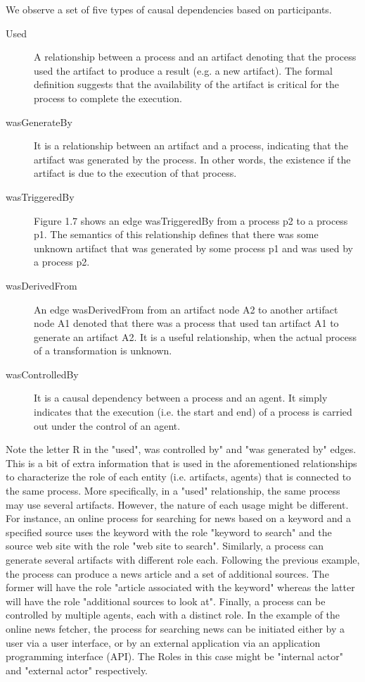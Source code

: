 We observe a set of five types of causal dependencies based on participants.

\begin{description}
  \item[Used]
        A relationship between a process and an artifact denoting that the process used the artifact to produce a result (e.g. a new artifact). The formal definition suggests that the availability of the artifact is critical for the process to complete the execution.
  \item[wasGenerateBy]
        It is a relationship between an artifact and a process, indicating that the artifact was generated by the process. In other words, the existence if the artifact is due to the execution of that process.
  \item[wasTriggeredBy]
        Figure 1.7 shows an edge wasTriggeredBy from a process p2 to a process p1. The semantics of this relationship defines that there was some unknown artifact that was generated by some process p1 and was used by a process p2.
  \item[wasDerivedFrom]
        An edge wasDerivedFrom from an artifact node A2 to another artifact node A1 denoted that there was a process that used tan artifact A1 to generate an artifact A2. It is a useful relationship, when the actual process of a transformation is unknown.
  \item[wasControlledBy]
        It is a causal dependency between a process and an agent. It simply indicates that the execution (i.e. the start and end) of a process is carried out under the control of an agent.
\end{description}

Note the letter R in the "used", was controlled by" and "was generated by" edges. This is a bit of extra information that is used in the aforementioned relationships to characterize the role of each entity (i.e. artifacts, agents) that is connected to the same process. More specifically, in a "used" relationship, the same process may use several artifacts. However, the nature of each usage might be different. For instance, an online process for searching for news based on a keyword and a specified source uses the keyword with the role "keyword to search" and the source web site with the role "web site to search". Similarly, a process can generate several artifacts with different role each. Following the previous example, the process can produce a news article and a set of additional sources. The former will have the role "article associated with the keyword" whereas the latter will have the role "additional sources to look at". Finally, a process can be controlled by multiple agents, each with a distinct role. In the example of the online news fetcher, the process for searching news can be initiated either by a user via a user interface, or by an external application via an application programming interface (API). The Roles in this case might be "internal actor" and "external actor" respectively.

